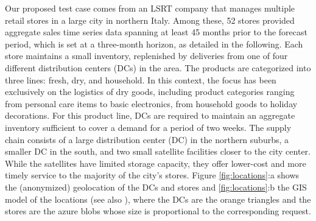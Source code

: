 \documentclass[ijoc,sglanonrev]{informs4}
\begin{document}
Our proposed test case comes from an LSRT company that manages multiple retail stores in a large city in northern Italy. Among these, 52 stores provided aggregate sales time series data spanning at least 45 months prior to the forecast period, which is set at a three-month horizon, as detailed in the following. Each store maintains a small inventory, replenished by deliveries from one of four different distribution centers (DCs) in the area. The products are categorized into three lines: fresh, dry, and household. In this context, the focus has been exclusively on the logistics of dry goods, including product categories ranging from personal care items to basic electronics, from household goods to holiday decorations. For this product line, DCs are required to maintain an aggregate inventory sufficient to cover a demand for a period of two weeks.
The supply chain consists of a large distribution center (DC) in the northern suburbs, a smaller DC in the south, and two small satellite facilities closer to the city center. While the satellites have limited storage capacity, they offer lower-cost and more timely service to the majority of the city's stores. Figure \ref{fig:locations}:a shows the (anonymized) geolocation of the DCs and stores and \ref{fig:locations}:b the GIS model of the locations (see also \citep{MZ23}), where the DCs are the orange triangles and the stores are the azure blobs whose size is proportional to the corresponding request.
\end{document}
